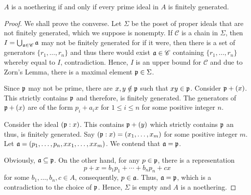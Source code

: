\begin{lemma}[Cohen]
    $A$ is a noethering if and only if every prime ideal in $A$ is finitely generated.
\end{lemma}
\begin{proof}
    We shall prove the converse. Let $\Sigma$ be the poset of proper ideals that are not finitely generated, which we suppose is nonempty. If $\mathscr C$ is a chain in $\Sigma$, then $I = \bigcup_{\mathfrak a\in\mathscr C}\mathfrak a$ may not be finitely generated for if it were, then there is a set of generators $\{r_1,\ldots,r_n\}$ and thus there would exist $\mathfrak a\in\mathscr C$ containing $\{r_1,\ldots,r_n\}$ whereby equal to $I$, contradiction. Hence, $I$ is an upper bound for $\mathscr C$ and due to Zorn's Lemma, there is a maximal element $\mathfrak p\in\Sigma$.

    Since $\mathfrak p$ may not be prime, there are $x,y\notin\mathfrak p$ such that $xy\in\mathfrak p$. Consider $\mathfrak p + (x)$. This strictly contains $\mathfrak p$ and therefore, is finitely generated. The generators of $\mathfrak p + (x)$ are of the form $p_i + a_ix$ for $1\le i\le n$ for some positive integer $n$. 

    Consider the ideal $(\mathfrak p: x)$. This contains $\mathfrak p + (y)$ which strictly contains $\mathfrak p$ an thus, is finitely generated. Say $(\mathfrak p: x) = (x_1,\ldots,x_m)$ for some positive integer $m$. Let $\mathfrak a = (p_1,\ldots,p_n,xx_1,\ldots,xx_m)$. We contend that $\mathfrak a = \mathfrak p$.

    Obviously, $\mathfrak a\subseteq\mathfrak p$. On the other hand, for any $p\in\mathfrak p$, there is a representation 
    \begin{equation*}
        p + x = b_1p_1 + \cdots + b_np_n + cx
    \end{equation*}
    for some $b_1,\ldots,b_n,c\in A$, consequently, $p\in\mathfrak a$. Thus, $\mathfrak a = \mathfrak p$, which is a contradiction to the choice of $\mathfrak p$. Hence, $\Sigma$ is empty and $A$ is a noethering.
\end{proof}


